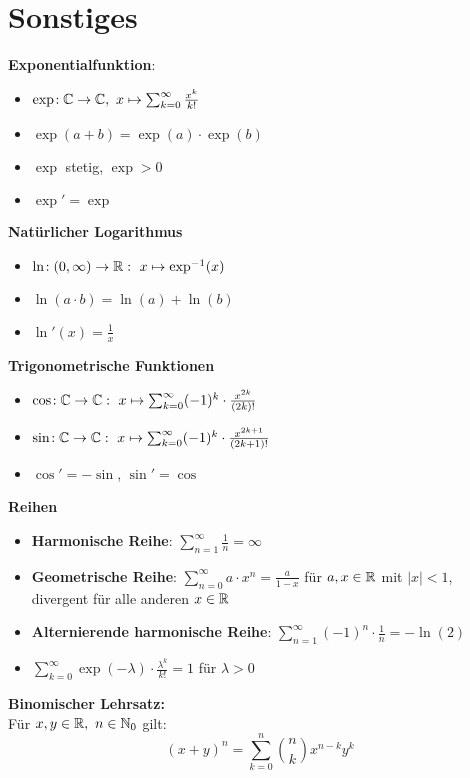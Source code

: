 \section{Sonstiges}

\textbf{Exponentialfunktion}:
\begin{itemize}
\item $\exp\!: \mathbb{C}\to\mathbb{C},\ x \mapsto \sum_{k=0}^\infty \frac{x^k}{k!}$

\item $\exp(a + b) = \exp(a) \cdot \exp(b)$

\item $\exp$ stetig, $\exp > 0$

\item $\exp' = \exp$
\end{itemize}

\textbf{Natürlicher Logarithmus}
\begin{itemize}
\item $\ln\!: (0,\infty)\to\mathbb{R}:\ x \mapsto \exp^{-1}(x)$

\item $\ln(a \cdot b) = \ln(a) + \ln(b)$

\item $\ln'(x) = \frac{1}{x}$
\end{itemize}

\textbf{Trigonometrische Funktionen}
\begin{itemize}
\item $\cos\!: \mathbb{C}\to\mathbb{C}:\ x \mapsto \sum_{k=0}^\infty (-1)^k \cdot \frac{x^{2k}}{(2k)!}$

\item $\sin\!: \mathbb{C}\to\mathbb{C}:\ x \mapsto \sum_{k=0}^\infty (-1)^k \cdot \frac{x^{2k+1}}{(2k+1)!}$

\item $\cos' = -\sin$, $\sin' = \cos$
\end{itemize}

\textbf{Reihen}
\begin{itemize}
\item \textbf{Harmonische Reihe}: $\sum_{n=1}^\infty \frac{1}{n} = \infty$

\item \textbf{Geometrische Reihe}:
  $\sum_{n=0}^\infty a \cdot x^n = \frac{a}{1-x}$
  für $a,x\in\mathbb{R}$ mit $|x| < 1$, divergent für alle anderen $x\in\mathbb{R}$

\item \textbf{Alternierende harmonische Reihe}:
$\sum_{n=1}^\infty (-1)^n \cdot \frac{1}{n} = -\ln(2)$

\item $\sum_{k=0}^\infty \exp(-\lambda) \cdot \frac{\lambda^k}{k!} = 1$
  für $\lambda > 0$
\end{itemize}

\textbf{Binomischer Lehrsatz:}\\
Für $x,y\in\mathbb{R},\ n\in\mathbb{N}_0$ gilt:
\[
  (x+y)^n=\sum_{k=0}^n\binom{n}{k}x^{n-k}y^k
\]